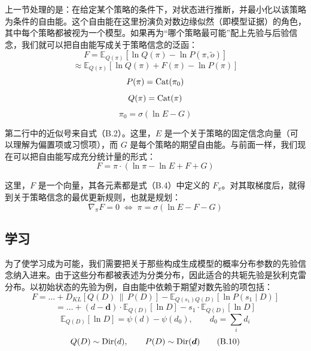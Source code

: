 上一节处理的是：在给定某个策略的条件下，对状态进行推断，并最小化以该策略为条件的自由能。这个自由能在这里扮演负对数边缘似然（即模型证据）的角色，其中每个策略都被视为一个模型。如果再为“哪个策略最可能”配上先验与后验信念，我们就可以把自由能写成关于策略信念的泛函：
\begin{equation}
F=\mathbb{E}_{Q(\pi)}\!\left[\ln Q(\pi)-\ln P(\pi,\tilde{o})\right]
\end{equation}
\begin{equation}
\approx
\mathbb{E}_{Q(\pi)}\!\left[\ln Q(\pi)+F(\pi)-\ln P(\pi)\right]
\end{equation}
\begin{equation}
P(\pi)=\operatorname{Cat}(\pi_0)
\end{equation}
\begin{equation}
Q(\pi)=\operatorname{Cat}(\pi)
\end{equation}
\begin{equation}
\pi_0=\sigma(\ln E-G)
\tag{B.7}
\end{equation}

第二行中的近似号来自式（B.2）。这里，$E$ 是一个关于策略的固定信念向量（可以理解为偏置项或习惯项），而 $G$ 是每个策略的期望自由能。与前面一样，我们现在可以把自由能写成充分统计量的形式：
\begin{equation}
F=\pi\cdot(\ln\pi-\ln E+F+G)
\tag{B.8}
\end{equation}

这里，$F$ 是一个向量，其各元素都是式（B.4）中定义的 $F_\pi$。对其取梯度后，就得到关于策略信念的最优更新规则，也就是规划：
\begin{equation}
\nabla_\pi F=0
\;\Leftrightarrow\;
\pi=\sigma(\ln E-F-G)
\tag{B.9}
\end{equation}

\subsection{学习}

为了使学习成为可能，我们需要把关于那些构成生成模型的概率分布参数的先验信念纳入进来。由于这些分布都被表述为分类分布，因此适合的共轭先验是狄利克雷分布。以初始状态的先验为例，自由能中依赖于期望对数先验的项包括：
\begin{equation}
F
=
\ldots + D_{KL}[Q(D)\,\|\,P(D)]-\mathbb{E}_{Q(s_1)Q(D)}[\ln P(s_1\mid D)]
\end{equation}
\begin{equation}
=
\ldots + (d-\boldsymbol{d})\cdot \mathbb{E}_{Q(D)}[\ln D]-s_1\cdot \mathbb{E}_{Q(D)}[\ln D]
\end{equation}
\begin{equation}
\mathbb{E}_{Q(D)}[\ln D]=\psi(d)-\psi(d_0),
\qquad
d_0=\sum_i d_i
\end{equation}
\begin{equation}
Q(D)\sim \operatorname{Dir}(d),
\qquad
P(D)\sim \operatorname{Dir}(\boldsymbol{d})
\tag{B.10}
\end{equation}

